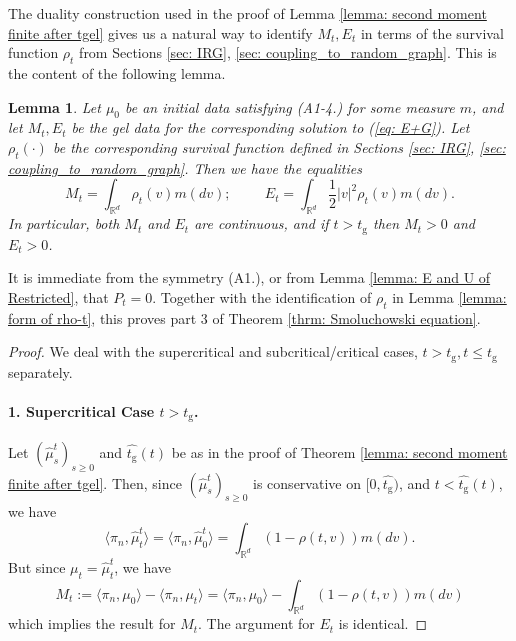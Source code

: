 \documentclass[11pt, notitlepage]{article}
\newtheorem{lem}[thm]{Lemma}
\begin{document}
The duality construction used in the proof of Lemma \ref{lemma: second moment finite after tgel} gives us a natural way to identify $M_t, E_t$ in terms of the survival function $\rho_t$ from Sections \ref{sec: IRG}, \ref{sec: coupling_to_random_graph}. This is the content of the following lemma. \begin{lem}\label{lemma: representation of M, E} Let $\mu_0$ be an initial data satisfying (A1-4.) for some measure $m$, and let $M_t, E_t$ be the gel data for the corresponding solution to (\ref{eq: E+G}). Let $\rho_t(\cdot)$ be the corresponding survival function defined in Sections \ref{sec: IRG}, \ref{sec: coupling_to_random_graph}. Then we have the equalities \begin{equation}\label{eq: formula for M, E}
    M_t = \int_{\mathbb{R}^d} \rho_t(v)m(dv); \hspace{1cm} E_t=\int_{\mathbb{R}^d} \frac{1}{2}|v|^2\rho_t(v)m(dv).
\end{equation} In particular, both $M_t$ and $E_t$ are continuous, and if $t>t_\mathrm{g}$ then $M_t>0$ and $E_t>0$. \end{lem} It is immediate from the symmetry (A1.), or from Lemma \ref{lemma: E and U of Restricted}, that $P_t=0$. Together with the identification of $\rho_t$ in Lemma \ref{lemma: form of rho-t}, this proves part 3 of Theorem \ref{thrm: Smoluchowski equation}. \begin{proof} We deal with the supercritical and subcritical/critical cases, $t>t_\mathrm{g}, t\le t_\mathrm{g}$ separately. 
\paragraph{1. Supercritical Case $t>t_\mathrm{g}$.}  Let $(\widehat{\mu}^t_s)_{s\geq 0}$ and $\widehat{t_\mathrm{g}}(t)$ be as in the proof of Theorem \ref{lemma: second moment finite after tgel}. Then, since $(\widehat{\mu}^t_s)_{s\geq 0}$ is conservative on $[0, \widehat{t_\mathrm{g}})$, and $t<\widehat{t_\mathrm{g}}(t)$, we have \begin{equation}
    \langle \pi_n, \widehat{\mu}^t_t\rangle =\langle \pi_n, \widehat{\mu}^t_0\rangle = \int_{\mathbb{R}^d} (1-\rho(t,v))m(dv).
\end{equation} But since $\mu_t=\widehat{\mu}^t_t$, we have \begin{equation}
    M_t:=\langle \pi_n, \mu_0\rangle -\langle \pi_n, \mu_t\rangle =\langle \pi_n, \mu_0\rangle - \int_{\mathbb{R}^d} (1-\rho(t,v))m(dv)
\end{equation} which implies the result for $M_t$. The argument for $E_t$ is identical. 


\end{proof}
\end{document}
